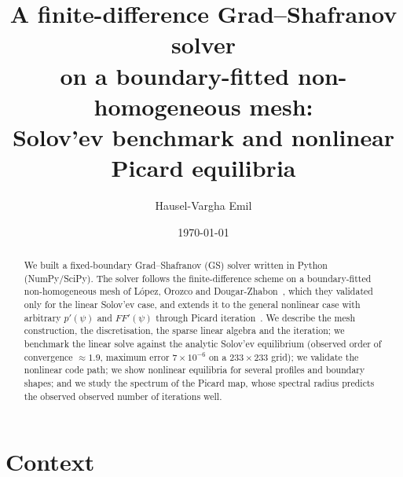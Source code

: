 \documentclass[11pt,a4paper]{article}
\title{A finite-difference Grad--Shafranov solver\\ on a boundary-fitted non-homogeneous mesh:\\ Solov'ev benchmark and nonlinear Picard equilibria}
\author{Hausel-Vargha Emil}
\date{\today}
\begin{document}
\maketitle

\begin{abstract}
We built a fixed-boundary Grad--Shafranov (GS) solver written in Python (NumPy/SciPy). The solver follows the finite-difference scheme on a boundary-fitted non-homogeneous mesh of L\'opez, Orozco and Dougar-Zhabon~\cite{lopez2019}, which they validated only for the linear Solov'ev case, and extends it to the general nonlinear case with arbitrary $p'(\psi)$ and $FF'(\psi)$ through Picard iteration~\cite{jardin2010}. We describe the mesh construction, the discretisation, the sparse linear algebra and the iteration; we benchmark the linear solve against the analytic Solov'ev equilibrium (observed order of convergence $\approx 1.9$, maximum error $7\times10^{-6}$ on a $233\times233$ grid); we validate the nonlinear code path; we show nonlinear equilibria for several profiles and boundary shapes; and we study the spectrum of the Picard map, whose spectral radius predicts the observed observed number of iterations well.
\end{abstract}
\clearpage

\tableofcontents

\clearpage
\section{Context}\label{sec:context}
\end{document}
